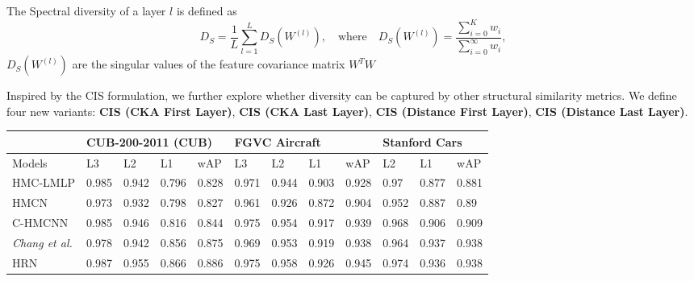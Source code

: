 \documentclass[10pt,twocolumn]{article}
\begin{document}
\begin{itemize} [topsep=3pt, itemsep=2pt, parsep=1pt]
The Spectral diversity of a layer $l$ is defined as  
\[
D_S = \frac{1}{L} \sum_{l=1}^L D_S(W^{(l)}), \quad \text{where} \quad D_S(W^{(l)}) = \frac{\sum_{i=0}^K w_i}{\sum_{i=0}^\infty w_i},
\]
$D_S(W^{(l)})$ are the singular values of the feature covariance matrix $W^T W$

Inspired by the CIS formulation, we further explore whether diversity can be captured by other structural similarity metrics. We define four new variants: \textbf{CIS (CKA First Layer)}, \textbf{CIS (CKA Last Layer)}, \textbf{CIS (Distance First Layer)}, \textbf{CIS (Distance Last Layer)}.

\end{itemize}

\begin{table}[ht]
\centering
\small
\begin{tabular}{|l|llll|llll|lll|}
\hline
                     & \multicolumn{4}{l|}{CUB-200-2011 (CUB)}                           & \multicolumn{4}{l|}{FGVC Aircraft}                                & \multicolumn{3}{l|}{Stanford Cars}               \\ \hline
Models               & L3             & L2             & L1             & wAP            & L3             & L2             & L1             & wAP            & L2             & L1             & wAP            \\ \hline
HMC-LMLP \cite{cerri_reduction_2016}     & 0.985          & 0.942          & 0.796          & 0.828          & 0.971          & 0.944          & 0.903          & 0.928          & 0.97           & 0.877          & 0.881          \\
HMCN \cite{wehrmann_hierarchical_nodate}        & 0.973          & 0.932          & 0.798          & 0.827          & 0.961          & 0.926          & 0.872          & 0.904          & 0.952          & 0.887          & 0.89           \\
C-HMCNN \cite{giunchiglia_coherent_2020}      & 0.985          & 0.946          & 0.816          & 0.844          & 0.975          & 0.954          & 0.917          & 0.939          & 0.968          & 0.906          & 0.909          \\
\textit{Chang et al.} \cite{chang_your_2021} & 0.978          & 0.942          & 0.856          & 0.875          & 0.969          & 0.953          & 0.919          & 0.938          & 0.964          & 0.937          & 0.938          \\
HRN \cite{chen_label_2022}          & 0.987          & 0.955          & 0.866          & 0.886          & 0.975          & 0.958          & 0.926          & 0.945          & 0.974          & 0.936          & 0.938          \\

\end{tabular}
\end{table}
\end{document}
